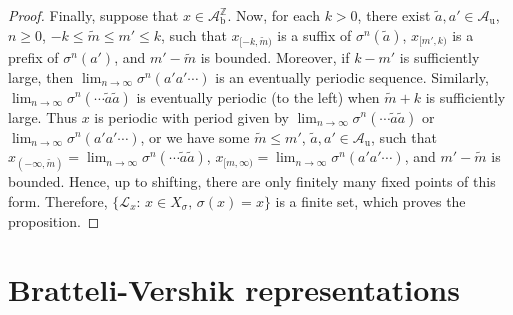 \documentclass{amsart}
\theoremstyle{definition}
\theoremstyle{remark}
\numberwithin{equation}{section}
\begin{document}
\begin{proof}
Finally, suppose that $x \in \mathcal{A}_\mathrm{b}^\mathbb{Z}$.
Now, for each $k > 0$, there exist $\tilde{a}, a' \in \mathcal{A}_\mathrm{u}$, $n \ge 0$, $-k \le \tilde{m} \le m' \le k$, such that $x_{[-k,\tilde{m})}$ is a suffix of $\sigma^n(\tilde{a})$, $x_{[m',k)}$ is a prefix of $\sigma^n(a')$, and $m'-\tilde{m}$ is bounded.
Moreover, if $k-m'$ is sufficiently large, then $\lim_{n\to\infty} \sigma^n(a'a'\cdots)$ is an eventually periodic sequence. 
Similarly, $\lim_{n\to\infty} \sigma^n(\cdots\tilde{a}\tilde{a})$ is eventually periodic (to the left) when $\tilde{m}+k$ is sufficiently large. 
Thus $x$ is periodic with period given by $\lim_{n\to\infty} \sigma^n(\cdots\tilde{a}\tilde{a})$ or $\lim_{n\to\infty} \sigma^n(a'a'\cdots)$, or we have some $\tilde{m} \le m'$, $\tilde{a}, a' \in \mathcal{A}_\mathrm{u}$, such that $x_{(-\infty,\tilde{m})} = \lim_{n\to\infty} \sigma^n(\cdots\tilde{a}\tilde{a})$, $x_{[m,\infty)} = \lim_{n\to\infty} \sigma^n(a'a'\cdots)$, and $m' - \tilde{m}$ is bounded.
Hence, up to shifting, there are only finitely many fixed points of this form. 
Therefore, $\{\mathcal{L}_x:\, x \in X_\sigma,\, \sigma(x) = x\}$ is a finite set, which proves the proposition.
\end{proof}

\section{Bratteli-Vershik representations} \label{sec:bratt-versh-repr}
\end{document}

